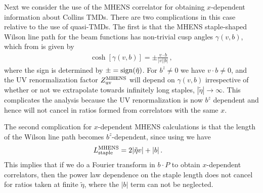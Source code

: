 \documentclass[11pt,a4paper]{article}
\begin{document}
Next we consider the use of the MHENS correlator for obtaining $x$-dependent information about Collins TMDs.  There are two complications in this case relative to the use of quasi-TMDs. The first is that the MHENS staple-shaped Wilson line path for the beam functions has non-trivial cusp angles $\gamma(v,b)$, which from  is given by 
\begin{align} \label{eq:MHENScusps}
  \cosh[\gamma(v,b)] = \pm \frac{v\cdot b}{|v||b|}
  \,,
\end{align}
where the sign is determined by $\pm = {\rm sign}(\tilde\eta)$. 
For $b^z\ne 0$ we have $v\cdot b\ne 0$, and the UV renormalization factor $Z_{\rm uv}^{\rm MHENS}$ will depend on $\gamma(v,b)$ irrespective of whether or not we extrapolate towards infinitely long staples, $|\tilde\eta|\to \infty$. This complicates the analysis because the UV renormalization is now $b^z$ dependent and hence will not cancel in ratios formed from correlators with the same $x$.  

The second complication for $x$-dependent MHENS calculations is that the length of the Wilson line path becomes $b^z$-dependent, since using  we have 
\begin{align}  \label{eq:Lstaple_MHENS}
  L_{\rm staple}^{\rm MHENS} &= 2|\tilde \eta v|  + |b|
  \,.
\end{align}
This implies that if we do a Fourier transform in $b\cdot P$ to obtain $x$-dependent correlators, then the power law dependence on the staple length does not cancel for ratios taken at finite $\tilde\eta$, where the $|b|$ term can not be neglected.
\end{document}
